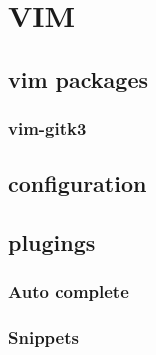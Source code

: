 \chapter{VIM} 

\section{vim packages} 

\subsection{vim-gitk3} 
\section{configuration} 

\section{plugings} 

\subsection{Auto complete} 

\subsection{Snippets} 
